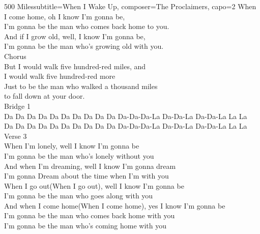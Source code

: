 \begin{song}{500 Miles}{subtitle={When I Wake Up}, composer={The Proclaimers}, capo={2}}
When I come home, oh I know I'm gonna be, \\
I'm gonna be the man who comes back home to you. \\

And if I grow old, well, I know I'm gonna be, \\
I'm gonna be the man who's growing old with you. \\

Chorus \\
But I would walk five hundred-red miles, and \\
I would walk five hundred-red more \\
Just to be the man who walked a thousand miles \\
to fall down at your door.     \\

Bridge 1 \\
Da Da Da Da          Da Da Da Da      Da Da Da-Da-Da-La Da-Da-La Da-Da-La La La \\

Da Da Da Da           Da Da Da Da      Da Da Da-Da-Da-La Da-Da-La Da-Da-La La La \\

Verse 3 \\
When I'm lonely, well I know I'm gonna be \\
I'm gonna be the man who's lonely without you \\
And when I'm dreaming, well I know I'm gonna dream \\
I'm gonna Dream about the time when I'm with you \\

When I go out(When I go out), well I know I'm gonna be \\
I'm gonna be the man who goes along with you \\
And when I come home(When I come home), yes I know I'm gonna be \\
I'm gonna be the man who comes back home with you \\
I'm gonna be the man who's coming home with you \\


\end{song}
